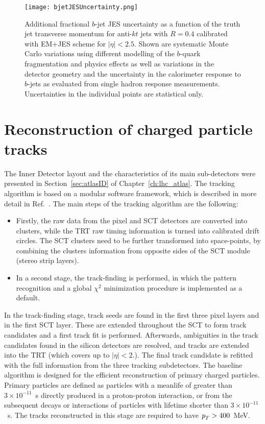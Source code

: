 \begin{figure}[htbp]
  \begin{center}
      \texttt{[image: bjetJESUncertainty.png]}
    \caption{Additional fractional $b$-jet JES uncertainty as a function of the truth jet transverse momentum for anti-$kt$ jets with $R=0.4$ calibrated with EM+JES scheme for $|\eta| < 2.5$. Shown are systematic Monte Carlo variations using different modelling of the $b$-quark fragmentation and physics effects as well as variations in the detector geometry and the uncertainty in the calorimeter response to $b$-jets as evaluated from single hadron response measurements.  Uncertainties in the individual points are statistical only. }
    \label{fig:bjetJESuncertainty}
  \end{center}
\end{figure}


\section{Reconstruction of charged particle tracks}\label{sec:trackreco}

The Inner Detector layout and the characteristics of its main sub-detectors were presented in Section~\ref{sec:atlasID} of Chapter~\ref{ch:lhc_atlas}. The tracking algorithm is based on a modular software framework, which is described in more detail in Ref.~\cite{Cornelissen:1020106}. The main steps of the tracking algorithm are the following:

\begin{itemize}
\item
Firstly, the raw data from the pixel and SCT detectors are converted into clusters, while the TRT raw timing information is turned into calibrated drift circles. The SCT clusters need to be further transformed into space-points, by combining the clusters information from opposite sides of the SCT module (stereo strip layers).
\item
In a second stage, the track-finding is performed, in which the pattern recognition and a global $\chi^2$ minimization procedure is implemented as a default.
\end{itemize}

In the track-finding stage, track seeds are found in the first three pixel layers and in the first SCT layer. These are extended throughout the SCT to form track candidates and a first track fit is performed. Afterwards, ambiguities in the track candidates found in the silicon detectors are resolved, and tracks are extended into the TRT (which covers up to $|\eta|<2.$). The final track candidate is refitted with the full information from the three tracking subdetectors. The baseline algorithm is designed for the efficient reconstruction of primary charged particles. Primary particles are defined as particles with a meanlife of greater than $3 \times 10^{-11}$~s directly produced in a proton-proton interaction, or from the subsequent decays or interactions of particles with lifetime shorter than $3 \times 10^{-11}$~s. The tracks reconstructed in this stage are required to have ${\emph{p}_{T}}> 400$~MeV.

